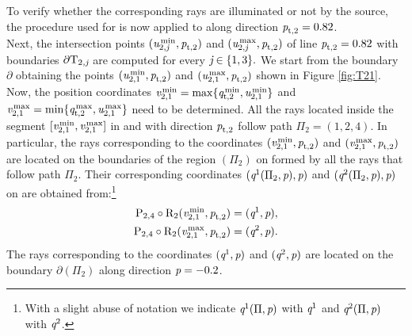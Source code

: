  To verify whether the corresponding rays are illuminated or not by the source, the procedure used for
  is now applied to 
 along direction $\textit{p}_{\textrm{t,} \textit{$2$}}=0.82$. \\ \indent
  Next, the intersection points $(\textit{u}_{2,\textit{j}}^\textrm{\,min}, \textit{p}_{\textrm{t,} \textit{$2$}})$ and
$(\textit{u}_{2,\textit{j}}^\textrm{\,max}, \textit{p}_{\textrm{t,} \textit{$2$}})$
of line $\textit{p}_{\textrm{t,} \textit{$2$}}= 0.82$
 with boundaries $\partial\mbox{$\textup{T}_{\textit{$2$,\textit{j}}}$}$ are computed for every $\textit{j}\in\{1,3\}.$
 We start from the boundary $\partial$ obtaining the points $(\textit{u}_{2, 1}^\textrm{\,min}, \textit{p}_{\textrm{t,} \textit{$2$}})$ and
 $(\textit{u}_{2, 1}^\textrm{\,max}, \textit{p}_{\textrm{t,} \textit{$2$}})$ shown in Figure \ref{fig:T21}.
 Now, the position coordinates $\textit{v}_{2, 1}^\textrm{\,min} = \max\{\textit{q}_{\textrm{t,} \textit{$2$}}^ \textrm{\,min},\textit{u}_{2,1}^\textrm{\,min}\}$
 and $\textit{v}_{2, 1}^\textrm{\,max} = \min\{\textit{q}_{\textrm{t,} \textit{$2$}}^ \textrm{\,max},\textit{u}_{2, 1}^\textrm{\,max}\}$ need to be determined.
 All the rays located inside the segment $[\textit{v}_{2, 1}^\textrm{\,min},\textit{v}_{2, 1}^\textrm{\,max}]$ in
   and with direction $\textit{p}_{\textrm{t,} \textit{$2$}}$ follow path $\Pi_2 = (1,2,4)$. In particular, the rays corresponding to the coordinates $(\textit{v}_{2, 1}^\textrm{\,min},\textit{p}_{\textrm{t,} \textit{$2$}} )$ and $(\textit{v}_{2, 1}^\textrm{\,max},\textit{p}_{\textrm{t,} \textit{$2$}} )$ are  located on the boundaries of the region $(\Pi_2)$ on 
  formed by all the rays that follow path $\Pi_2$.
  Their corresponding coordinates $(\textit{q}^{1}(\Pi_2, \textit{p}), \textit{p})$ and
 $(\textit{q}^{2}(\Pi_2, \textit{p}), \textit{p})$ on  are obtained from:\footnote{With a slight abuse of notation we indicate  $\textit{q}^{1}(\Pi, \textit{p})$ with $\textit{q}^{1}$ and 
$ \textit{q}^{2}(\Pi, \textit{p})$ with $\textit{q}^{2}$.}
\begin{equation}
\begin{split}
\mathrm{P}_{2,4} \circ \mathrm{R}_{2} (\textit{v}_{2, 1}^\textrm{\,min},\textit{p}_{\textrm{t,} \textit{$2$}} ) & = (\textit{q}^{1}, \textit{p}), \\
\mathrm{P}_{2,4} \circ \mathrm{R}_{2} (\textit{v}_{2, 1}^\textrm{\,max},\textit{p}_{\textrm{t,} \textit{$2$}} ) & = (\textit{q}^{2}, \textit{p}).
\end{split}
\end{equation} 
The rays corresponding to the coordinates $(\textit{q}^{1}, \textit{p})$ and $(\textit{q}^{2}, \textit{p})$ are located
 on the boundary $\partial$$(\Pi_2)$ along direction $\textit{p}=-0.2$.
